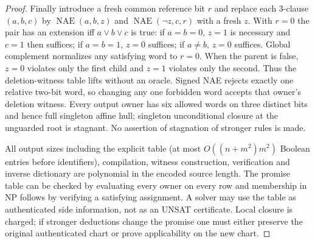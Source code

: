 \documentclass[11pt]{article}
\begin{document}
\begin{proof}
Finally introduce a fresh common reference bit $r$ and replace each 3-clause $(a,b,c)$ by $\operatorname{NAE}(a,b,z)$ and $\operatorname{NAE}(\neg z,c,r)$ with a fresh $z$. With $r=0$ the pair has an extension iff $a\vee b\vee c$ is true: if $a=b=0$, $z=1$ is necessary and $c=1$ then suffices; if $a=b=1$, $z=0$ suffices; if $a\ne b$, $z=0$ suffices. Global complement normalizes any satisfying word to $r=0$. When the parent is false, $z=0$ violates only the first child and $z=1$ violates only the second. Thus the deletion-witness table lifts without an oracle. Signed NAE rejects exactly one relative two-bit word, so changing any one forbidden word accepts that owner's deletion witness. Every output owner has six allowed words on three distinct bits and hence full singleton affine hull; singleton unconditional closure at the unguarded root is stagnant. No assertion of stagnation of stronger rules is made.

All output sizes including the explicit table (at most $O((n+m^2)m^2)$ Boolean entries before identifiers), compilation, witness construction, verification and inverse dictionary are polynomial in the encoded source length. The promise table can be checked by evaluating every owner on every row and membership in NP follows by verifying a satisfying assignment. A solver may use the table as authenticated side information, not as an UNSAT certificate. Local closure is charged; if stronger deductions change the promise one must either preserve the original authenticated chart or prove applicability on the new chart.
\end{proof}
\end{document}
